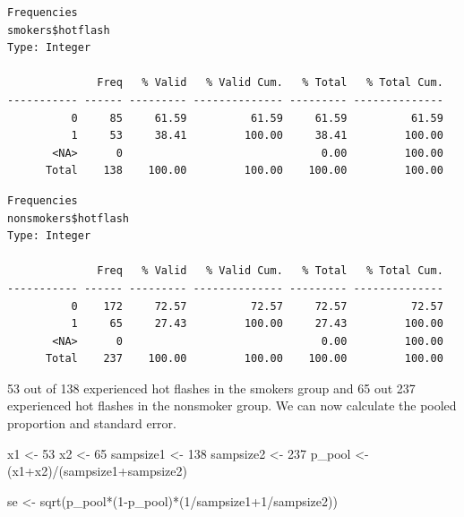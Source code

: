 \documentclass[
  letterpaper,
  DIV=11,
  numbers=noendperiod]{scrartcl}
\newenvironment{Shaded}{\begin{snugshade}}{\end{snugshade}}
\newcommand{\DecValTok}[1]{\textcolor[rgb]{0.68,0.00,0.00}{#1}}
\newcommand{\FunctionTok}[1]{\textcolor[rgb]{0.28,0.35,0.67}{#1}}
\newcommand{\NormalTok}[1]{\textcolor[rgb]{0.00,0.23,0.31}{#1}}
\newcommand{\OtherTok}[1]{\textcolor[rgb]{0.00,0.23,0.31}{#1}}
\newcommand{\SpecialCharTok}[1]{\textcolor[rgb]{0.37,0.37,0.37}{#1}}
\begin{document}
\begin{verbatim}
Frequencies  
smokers$hotflash  
Type: Integer  

              Freq   % Valid   % Valid Cum.   % Total   % Total Cum.
----------- ------ --------- -------------- --------- --------------
          0     85     61.59          61.59     61.59          61.59
          1     53     38.41         100.00     38.41         100.00
       <NA>      0                               0.00         100.00
      Total    138    100.00         100.00    100.00         100.00
\end{verbatim}

\begin{Shaded}
\end{Shaded}

\begin{verbatim}
Frequencies  
nonsmokers$hotflash  
Type: Integer  

              Freq   % Valid   % Valid Cum.   % Total   % Total Cum.
----------- ------ --------- -------------- --------- --------------
          0    172     72.57          72.57     72.57          72.57
          1     65     27.43         100.00     27.43         100.00
       <NA>      0                               0.00         100.00
      Total    237    100.00         100.00    100.00         100.00
\end{verbatim}

53 out of 138 experienced hot flashes in the smokers group and 65 out
237 experienced hot flashes in the nonsmoker group. We can now calculate
the pooled proportion and standard error.

\begin{Shaded}
\begin{Highlighting}[]
\NormalTok{x1 }\OtherTok{\textless{}{-}} \DecValTok{53}
\NormalTok{x2 }\OtherTok{\textless{}{-}} \DecValTok{65}
\NormalTok{sampsize1 }\OtherTok{\textless{}{-}} \DecValTok{138}
\NormalTok{sampsize2 }\OtherTok{\textless{}{-}} \DecValTok{237}
\NormalTok{p\_pool }\OtherTok{\textless{}{-}}\NormalTok{ (x1}\SpecialCharTok{+}\NormalTok{x2)}\SpecialCharTok{/}\NormalTok{(sampsize1}\SpecialCharTok{+}\NormalTok{sampsize2)}

\NormalTok{se }\OtherTok{\textless{}{-}} \FunctionTok{sqrt}\NormalTok{(p\_pool}\SpecialCharTok{*}\NormalTok{(}\DecValTok{1}\SpecialCharTok{{-}}\NormalTok{p\_pool)}\SpecialCharTok{*}\NormalTok{(}\DecValTok{1}\SpecialCharTok{/}\NormalTok{sampsize1}\SpecialCharTok{+}\DecValTok{1}\SpecialCharTok{/}\NormalTok{sampsize2))}
\end{Highlighting}
\end{Shaded}
\end{document}
